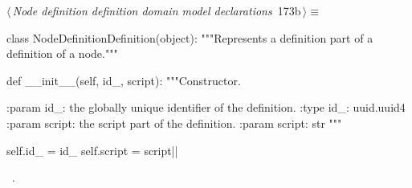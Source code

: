 \documentclass[%
    a4paper,    %
    justified,  %
    nobib,      %
    openany     %
]{tufte-book}
\begin{document}
\begin{flushleft} \small
\begin{minipage}{\linewidth}\label{scrap198}\raggedright\small
{} $\langle\,${\itshape Node definition definition domain model declarations}\nobreak\ {\footnotesize {173b}}$\,\rangle\equiv$
\vspace{-1ex}
\begin{pythoncode}
class NodeDefinitionDefinition(object):
    """Represents a definition part of a definition of a node."""

    def __init__(self, id_, script):
        """Constructor.

        :param id_: the globally unique identifier of the definition.
        :type  id_: uuid.uuid4
        :param script: the script part of the definition.
        :param script: str
        """

        self.id_ = id_
        self.script = script|\NWsep|
\end{pythoncode}
\vspace{1.5ex}
\footnotesize
\begin{list}{}{\setlength{\itemsep}{-\parsep}\setlength{\itemindent}{-\leftmargin}}
\item \NWtxtMacroRefIn\ .

\item{}
\end{list}
\end{minipage}\vspace{4ex}
\end{flushleft}
\end{document}
